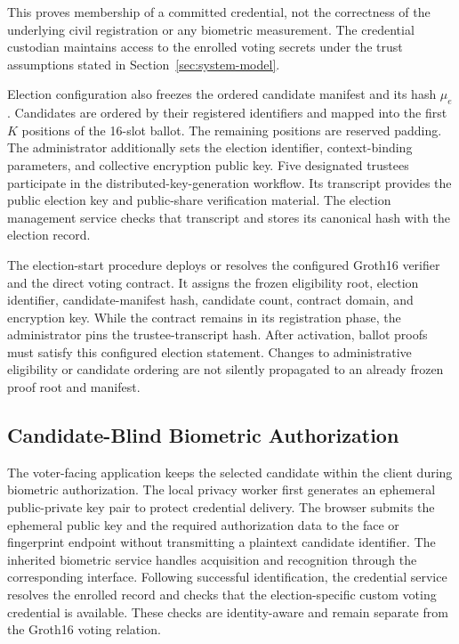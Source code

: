 This proves membership of a committed credential, not the correctness of
the underlying civil registration or any biometric measurement. The
credential custodian maintains access to the enrolled voting secrets under
the trust assumptions stated in Section~\ref{sec:system-model}.

Election configuration also freezes the ordered candidate manifest and
its hash $\mu_e$. Candidates are ordered by their registered identifiers
and mapped into the first $K$ positions of the 16-slot ballot. The
remaining positions are reserved padding. The administrator additionally
sets the election identifier, context-binding parameters, and collective
encryption public key. Five designated trustees participate in the
distributed-key-generation workflow. Its transcript provides the public
election key and public-share verification material. The election
management service checks that transcript and stores its canonical hash
with the election record.

The election-start procedure deploys or resolves the configured Groth16
verifier and the direct voting contract. It assigns the frozen eligibility
root, election identifier, candidate-manifest hash, candidate count,
contract domain, and encryption key. While the contract remains in its
registration phase, the administrator pins the trustee-transcript hash.
After activation, ballot proofs must satisfy this configured election
statement. Changes to administrative eligibility or candidate ordering
are not silently propagated to an already frozen proof root and manifest.

\subsection{Candidate-Blind Biometric Authorization}
\label{subsec:architecture-biometric-authorization}

The voter-facing application keeps the selected candidate within the
client during biometric authorization. The local privacy worker first
generates an ephemeral public-private key pair to protect credential
delivery. The browser submits the ephemeral public key and the required
authorization data to the face or fingerprint endpoint without transmitting
a plaintext candidate identifier. The inherited biometric service handles
acquisition and recognition through the corresponding interface. Following
successful identification, the credential service resolves the enrolled
record and checks that the election-specific custom voting credential is
available. These checks are identity-aware and remain separate from the
Groth16 voting relation.

